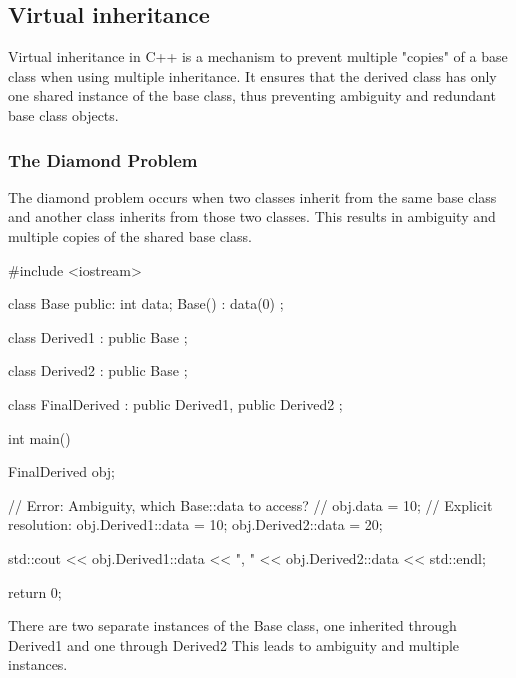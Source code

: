 \documentclass{report}
\begin{document}
    \subsection{Virtual inheritance}
    \bigbreak \noindent 
    Virtual inheritance in C++ is a mechanism to prevent multiple "copies" of a base class when using multiple inheritance. It ensures that the derived class has only one shared instance of the base class, thus preventing ambiguity and redundant base class objects.
    \bigbreak \noindent 
    \subsubsection{The Diamond Problem}
    \bigbreak \noindent 
    The diamond problem occurs when two classes inherit from the same base class and another class inherits from those two classes. This results in ambiguity and multiple copies of the shared base class.
    \bigbreak \noindent 
    \begin{cppcode}
        #include <iostream>

        class Base {
            public:
            int data;
            Base() : data(0) {}
        };

        class Derived1 : public Base {};

        class Derived2 : public Base {};

        class FinalDerived : public Derived1, public Derived2 {};

        int main() {
            FinalDerived obj;

            // Error: Ambiguity, which Base::data to access?
            // obj.data = 10;
            // Explicit resolution:
            obj.Derived1::data = 10;
            obj.Derived2::data = 20;

            std::cout << obj.Derived1::data << ", " << obj.Derived2::data << std::endl;

            return 0;
        }
    \end{cppcode}
    \bigbreak \noindent 
    There are two separate instances of the Base class, one inherited through Derived1 and one through Derived2 This leads to ambiguity and multiple instances.
    \pagebreak 
\end{document}
